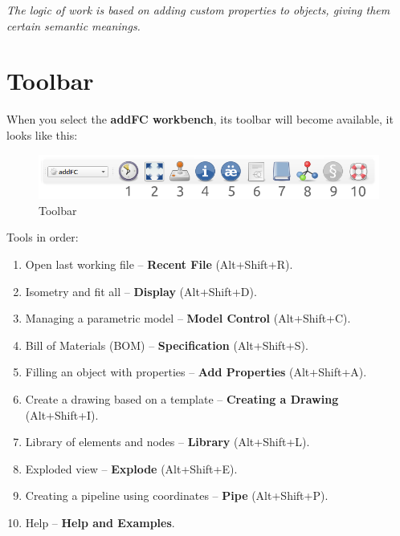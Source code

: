 \documentclass[a4paper,12pt]{article}
\begin{document}
\begin{center}\emph{The logic of work is based on adding custom properties to objects, giving them certain semantic meanings.}\end{center}




\section{Toolbar}

When you select the \textbf{addFC workbench}, its toolbar will become available, it looks like this:

\begin{figure}[htp]
	\centering
	\includegraphics[scale=0.8]{img/toolbar.png}
	\caption{Toolbar}
	\label{sec:toolbar}
\end{figure}

\begin{flushleft}Tools in order:\end{flushleft}
\begin{enumerate}
	\item Open last working file -- \textbf{Recent File} (Alt+Shift+R).\label{sec:1}
	\item Isometry and fit all -- \textbf{Display} (Alt+Shift+D).\label{sec:2}
	\item Managing a parametric model -- \textbf{Model Control} (Alt+Shift+C).\label{sec:3}
	\item Bill of Materials (BOM) -- \textbf{Specification} (Alt+Shift+S).\label{sec:4}
	\item Filling an object with properties -- \textbf{Add Properties} (Alt+Shift+A).\label{sec:5}
	\item Create a drawing based on a template -- \textbf{Creating a Drawing} (Alt+Shift+I).\label{sec:6}
	\item Library of elements and nodes -- \textbf{Library} (Alt+Shift+L).\label{sec:7}
	\item Exploded view -- \textbf{Explode} (Alt+Shift+E).\label{sec:8}
    \item Creating a pipeline using coordinates -- \textbf{Pipe} (Alt+Shift+P).\label{sec:9}
    \item Help -- \textbf{Help and Examples}.\label{sec:10}
\end{enumerate}
\end{document}
